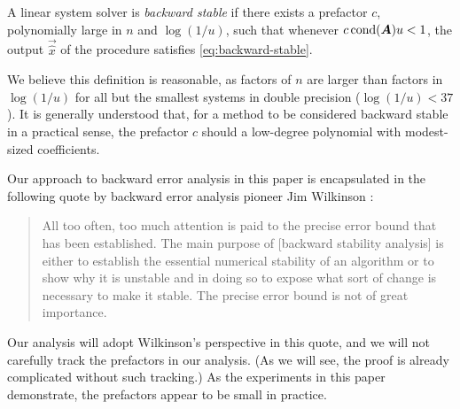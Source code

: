 \documentclass[onefignum,onetabnum,pagebackref,dvipsnames]{siamart220329}
\begin{document}
\begin{definition} 
    A linear system solver is \emph{backward stable} if there exists a prefactor $c$, polynomially large in $n$ and $\log(1/u)$, such that whenever $c\operatorname{cond}(\boldsymbol{A})u < 1$, the output $\vec{\hat{x}}$ of the procedure satisfies \cref{eq:backward-stable}.
\end{definition}
%
We believe this definition is reasonable, as factors of $n$ are larger than factors in $\log(1/u)$ for all but the smallest systems in double precision ($\log(1/u) < 37$).
It is generally understood that, for a method to be considered backward stable in a practical sense, the prefactor $c$ should a low-degree polynomial with modest-sized coefficients.


Our approach to backward error analysis in this paper is encapsulated in the following quote by backward error analysis pioneer Jim Wilkinson \cite[p.~356]{Wil74}:
%
\begin{quote}
    All too often, too much attention is paid to the precise error bound that has been established. The main purpose of [backward stability analysis] is either to establish the essential numerical stability of an algorithm or to show why it is unstable and in doing so to expose what sort of change is necessary to make it stable. The precise error bound is not of great importance.
\end{quote}
%
Our analysis will adopt Wilkinson's perspective in this quote, and we will not carefully track the prefactors in our analysis.
(As we will see, the proof is already complicated without such tracking.)
As the experiments in this paper demonstrate, the prefactors appear to be small in practice.
\end{document}
